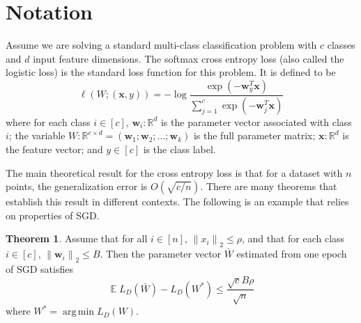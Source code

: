 \documentclass[twoside]{article}
\theoremstyle{definition}
\newtheorem{theorem}{Theorem}
\newcommand{\R}{\mathbb R}
\DeclareMathOperator{\E}{\mathbb E}
\DeclareMathOperator*{\argmin}{arg\,min}
\newcommand{\trans}[1]{{#1}^{T}}
\newcommand{\w}{\mathbf w}
\newcommand{\x}{\mathbf x}
\newcommand{\ltwo}[1]{{\lVert {#1} \rVert}_2}
\newcommand{\fixme}[1]{\noindent{\color{red}\textbf{FIXME:}  {#1}}}
\begin{document}
\section{Notation}

Assume we are solving a standard multi-class classification problem with $c$ classes and $d$ input feature dimensions.
The softmax cross entropy loss (also called the logistic loss) is the standard loss function for this problem.
It is defined to be
\begin{equation}
    \label{eq:xentropy}
    \ell(W;(\x,y)) = - \log \frac {\exp(-\trans\w_y \x)}{\sum_{j=1}^c \exp(-\trans \w_j \x)}
\end{equation}
where for each class $i\in[c]$,
$\w_i : \R^d$ is the parameter vector associated with class $i$;
the variable $W : \R^{c \times d} = (\w_1; \w_2; ...; \w_k)$ is the full parameter matrix;
$\x : \R^d$ is the feature vector;
and $y \in [c]$ is the class label.

The main theoretical result for the cross entropy loss is that for a dataset with $n$ points,
the generalization error is $O(\sqrt{c/n})$.
There are many theorems that establish this result in different contexts.
The following is an example that relies on properties of SGD.
\begin{theorem}
\label{theorem:xentropy}
Assume that for all $i\in[n]$, $\ltwo{x_i} \le \rho$,
    and that for each class $i\in[c]$, $\ltwo{\w_i}\le B$.
Then the parameter vector $\bar W$ estimated from one epoch of SGD satisfies
\begin{equation}
    \E L_D(\bar W) - L_D(W^*) \le \frac {\sqrt cB\rho}{\sqrt n}
\end{equation}
where $W^* = \argmin L_D(W)$.
\end{theorem}
\end{document}
